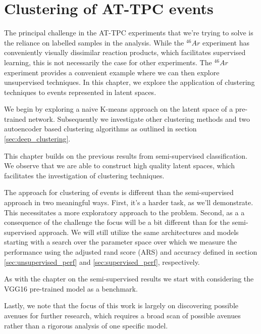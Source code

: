 \chapter{Clustering of AT-TPC events}\label{chap:clustering}

The principal challenge in the AT-TPC experiments that we're trying to solve is the reliance on labelled samples in the analysis. While the ${}^{46}Ar$ experiment has conveniently visually dissimilar reaction products, which facilitates supervised learning, this is not necessarily the case for other experiments. The ${}^{46}Ar$ experiment provides a convenient example where we can then explore unsupervised techniques. In this chapter, we explore the application of clustering techniques to events represented in latent spaces. 

We begin by exploring a naive K-means approach on the latent space of a pre-trained network. Subsequently we investigate other clustering methods and two autoencoder based clustering algorithms as outlined in section \ref{sec:deep_clustering}.

This chapter builds on the previous results from semi-supervised classification. We observe that we are able to construct high quality latent spaces, which facilitates the investigation of clustering techniques. 

The approach for clustering of events is different than the semi-supervised approach in two meaningful ways. First, it's a harder task, as we'll demonstrate. This necessitates a more exploratory approach to the problem. Second, as a a consequence of the challenge the focus will be a bit different than for the semi-supervised approach. We will still utilize the same architectures and models starting with a search over the parameter space over which we measure the performance using the adjusted rand score (ARS) and accuracy defined in section \ref{sec:unsupervised_perf} and \ref{sec:supervised_perf}, respectively.

As with the chapter on the semi-supervised results we start with considering the VGG16 pre-trained model as a benchmark.

Lastly, we note that the focus of this work is largely on discovering possible avenues for further research, which requires a broad scan of possible avenues rather than a rigorous analysis of one specific model.